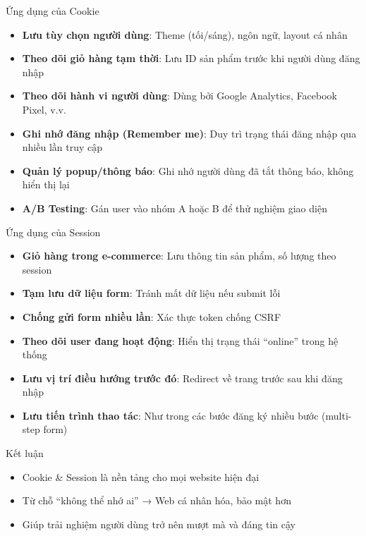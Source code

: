 \documentclass[aspectratio=169]{beamer}
\begin{document}
\begin{frame}{Ứng dụng của Cookie}
  \begin{itemize}
    \item \textbf{Lưu tùy chọn người dùng}: Theme (tối/sáng), ngôn ngữ, layout cá nhân
    \item \textbf{Theo dõi giỏ hàng tạm thời}: Lưu ID sản phẩm trước khi người dùng đăng nhập
    \item \textbf{Theo dõi hành vi người dùng}: Dùng bởi Google Analytics, Facebook Pixel, v.v.
    \item \textbf{Ghi nhớ đăng nhập (Remember me)}: Duy trì trạng thái đăng nhập qua nhiều lần truy cập
    \item \textbf{Quản lý popup/thông báo}: Ghi nhớ người dùng đã tắt thông báo, không hiển thị lại
    \item \textbf{A/B Testing}: Gán user vào nhóm A hoặc B để thử nghiệm giao diện
  \end{itemize}
\end{frame}

\begin{frame}{Ứng dụng của Session}
  \begin{itemize}
    \item \textbf{Giỏ hàng trong e-commerce}: Lưu thông tin sản phẩm, số lượng theo session
    \item \textbf{Tạm lưu dữ liệu form}: Tránh mất dữ liệu nếu submit lỗi
    \item \textbf{Chống gửi form nhiều lần}: Xác thực token chống CSRF
    \item \textbf{Theo dõi user đang hoạt động}: Hiển thị trạng thái “online” trong hệ thống
    \item \textbf{Lưu vị trí điều hướng trước đó}: Redirect về trang trước sau khi đăng nhập
    \item \textbf{Lưu tiến trình thao tác}: Như trong các bước đăng ký nhiều bước (multi-step form)
  \end{itemize}
\end{frame}

\begin{frame}{Kết luận}
  \begin{itemize}
    \item Cookie \& Session là nền tảng cho mọi website hiện đại
    \item Từ chỗ ``không thể nhớ ai'' → Web cá nhân hóa, bảo mật hơn
    \item Giúp trải nghiệm người dùng trở nên mượt mà và đáng tin cậy
  \end{itemize}
\end{frame}
\end{document}
